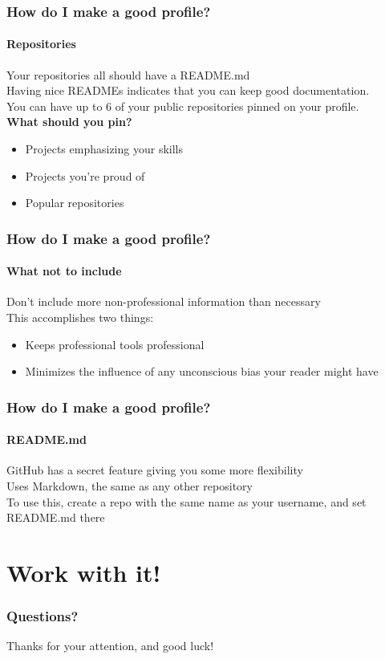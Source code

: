 \documentclass{beamer}
\begin{document}
\begin{frame}
  \frametitle{How do I make a good profile?}
  \framesubtitle{Repositories}
  Your repositories all should have a README.md\\\vspace{0.25em}
  Having nice READMEs indicates that you can keep good documentation.\\\pause\vspace{0.25em}
  You can have up to 6 of your public repositories pinned on your profile.\pause\\
  \textbf{What should you pin?}
  \begin{itemize}[<+->]
    \item Projects emphasizing your skills
    \item Projects you're proud of
    \item Popular repositories
  \end{itemize}
\end{frame}

\begin{frame}
  \frametitle{How do I make a good profile?}
  \framesubtitle{What not to include}
  Don't include more non-professional information than necessary\\\pause\vspace{0.25em}
  This accomplishes two things:
  \begin{itemize}[<+->]
    \item Keeps professional tools professional
    \item Minimizes the influence of any unconscious bias your reader might have
  \end{itemize}
\end{frame}

\begin{frame}
  \frametitle{How do I make a good profile?}
  \framesubtitle{README.md}
  GitHub has a secret feature giving you some more flexibility\\\vspace{0.25em}
  Uses Markdown, the same as any other repository\\\pause\vspace{0.25em}
  To use this, create a repo with the same name as your username, and set README.md there
\end{frame}

\section{Work with it!} %
\begin{frame}
  \frametitle{Questions?}
  Thanks for your attention, and good luck!
\end{frame}
\end{document}
